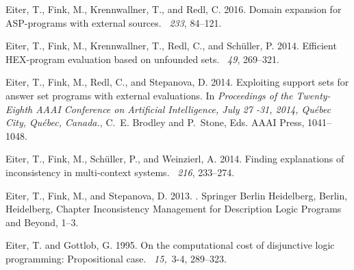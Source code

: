 \begin{thebibliography}{}
{\sc Eiter, T.}, {\sc Fink, M.}, {\sc Krennwallner, T.}, {\sc and} {\sc Redl,
  C.} 2016.
\newblock Domain expansion for {ASP}-programs with external sources.
~{\em 233}, 84--121.

{\sc Eiter, T.}, {\sc Fink, M.}, {\sc Krennwallner, T.}, {\sc Redl, C.}, {\sc
  and} {\sc Sch\"{u}ller, P.} 2014.
\newblock Efficient {HEX}-program evaluation based on unfounded sets.
~{\em 49},
  269--321.

{\sc Eiter, T.}, {\sc Fink, M.}, {\sc Redl, C.}, {\sc and} {\sc Stepanova, D.}
  2014.
\newblock Exploiting support sets for answer set programs with external
  evaluations.
\newblock In {\em Proceedings of the Twenty-Eighth {AAAI} Conference on
  Artificial Intelligence, July 27 -31, 2014, Qu{\'{e}}bec City, Qu{\'{e}}bec,
  Canada.}, {C.~E. Brodley} {and} {P.~Stone}, Eds. {AAAI} Press, 1041--1048.

{\sc Eiter, T.}, {\sc Fink, M.}, {\sc Sch{\"{u}}ller, P.}, {\sc and} {\sc
  Weinzierl, A.} 2014.
\newblock Finding explanations of inconsistency in multi-context systems.
~{\em 216}, 233--274.

{\sc Eiter, T.}, {\sc Fink, M.}, {\sc and} {\sc Stepanova, D.} 2013.
.
\newblock Springer Berlin Heidelberg, Berlin, Heidelberg, Chapter Inconsistency
  Management for Description Logic Programs and Beyond, 1--3.

{\sc Eiter, T.} {\sc and} {\sc Gottlob, G.} 1995.
\newblock On the computational cost of disjunctive logic programming:
  Propositional case.
~{\em 15,\/}~3-4, 289--323.


\end{thebibliography}
